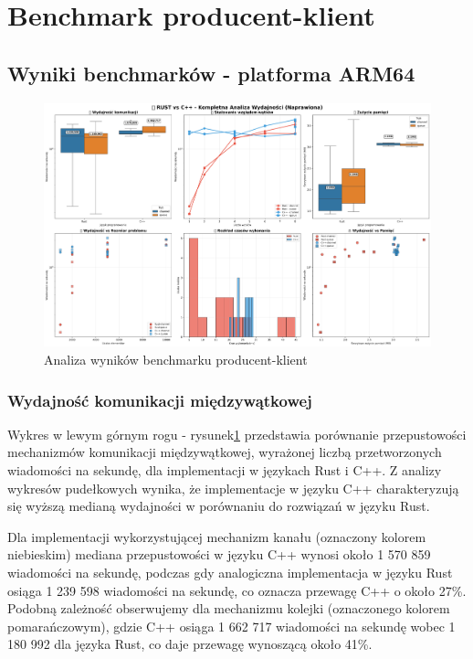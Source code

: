\section{Benchmark producent-klient}

\subsection{Wyniki benchmarków - platforma ARM64}

\begin{figure}[H]
    \centering
    \includegraphics[width=\textwidth]{analiza/images/conc/pc/arm/mega_overview_2x3.png}
    \caption{Analiza wyników benchmarku producent-klient}
    \label{analiza_benchmarku_producent_klient}
\end{figure}

\subsubsection{Wydajność komunikacji międzywątkowej}
Wykres w lewym górnym rogu - rysunek\ref{analiza_benchmarku_producent_klient} przedstawia porównanie przepustowości mechanizmów komunikacji międzywątkowej, wyrażonej liczbą przetworzonych wiadomości na sekundę, dla implementacji w językach Rust i C++. Z analizy wykresów pudełkowych wynika, że implementacje w języku C++ charakteryzują się wyższą medianą wydajności w porównaniu do rozwiązań w języku Rust.

Dla implementacji wykorzystującej mechanizm kanału (oznaczony kolorem niebieskim) mediana przepustowości w języku C++ wynosi około 1 570 859 wiadomości na sekundę, podczas gdy analogiczna implementacja w języku Rust osiąga 1 239 598 wiadomości na sekundę, co oznacza przewagę C++ o około 27\%. Podobną zależność obserwujemy dla mechanizmu kolejki (oznaczonego kolorem pomarańczowym), gdzie C++ osiąga 1 662 717 wiadomości na sekundę wobec 1 180 992 dla języka Rust, co daje przewagę wynoszącą około 41\%.

